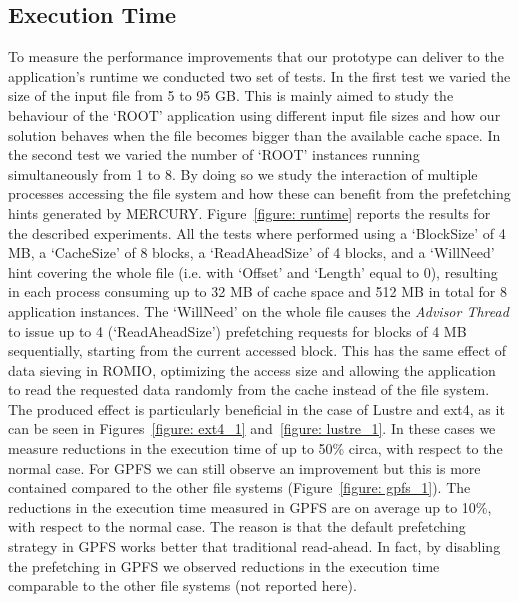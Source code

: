 \subsection{Execution Time}
\label{subsec: results}
To measure the performance improvements that our prototype can deliver to the application's runtime we conducted two set of tests. In the first test we varied the size of the input file from 5 to 95 GB. This is mainly aimed to study the behaviour of the `ROOT' application using different input file sizes and how our solution behaves when the file becomes bigger than the available cache space. In the second test we varied the number of `ROOT' instances running simultaneously from 1 to 8. By doing so we study the interaction of multiple processes accessing the file system and how these can benefit from the prefetching hints generated by MERCURY. Figure~\ref{figure: runtime} reports the results for the described experiments. All the tests where performed using a `BlockSize' of 4 MB, a `CacheSize' of 8 blocks, a `ReadAheadSize' of 4 blocks, and a `WillNeed' hint covering the whole file (i.e. with `Offset' and `Length' equal to 0), resulting in each process consuming up to 32 MB of cache space and 512 MB in total for 8 application instances. The `WillNeed' on the whole file causes the \textit{Advisor Thread} to issue up to 4 (`ReadAheadSize') prefetching requests for blocks of 4 MB sequentially, starting from the current accessed block. This has the same effect of data sieving in ROMIO, optimizing the access size and allowing the application to read the requested data randomly from the cache instead of the file system. The produced effect is particularly beneficial in the case of Lustre and ext4, as it can be seen in Figures~\ref{figure: ext4_1} and~\ref{figure: lustre_1}. In these cases we measure reductions in the execution time of up to 50\% circa, with respect to the normal case. For GPFS we can still observe an improvement but this is more contained compared to the other file systems (Figure~\ref{figure: gpfs_1}). The reductions in the execution time measured in GPFS are on average up to 10\%, with respect to the normal case. The reason is that the default prefetching strategy in GPFS works better that traditional read-ahead. In fact, by disabling the prefetching in GPFS we observed reductions in the execution time comparable to the other file systems (not reported here).
